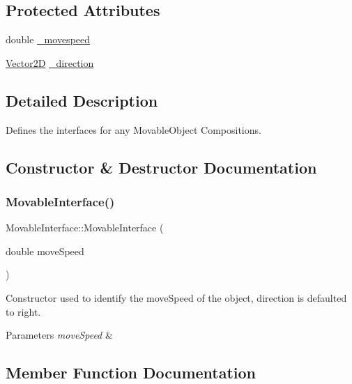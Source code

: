 \subsection*{Protected Attributes}
\begin{DoxyCompactItemize}
\item 
double \hyperlink{class_movable_interface_aa9715fd066607de7e71ee7f891ae1dbd}{\+\_\+movespeed}
\item 
\hyperlink{class_vector2_d}{Vector2D} \hyperlink{class_movable_interface_aea3e1edf8c32ebe5fd37dc02d659c10d}{\+\_\+direction}
\end{DoxyCompactItemize}


\subsection{Detailed Description}
Defines the interfaces for any Movable\+Object Compositions. 

\subsection{Constructor \& Destructor Documentation}
\mbox{\label{class_movable_interface_a480a181d92f826515483b8ba57e4f030}} 
\subsubsection{\texorpdfstring{Movable\+Interface()}{MovableInterface()}}
{\footnotesize\ttfamily Movable\+Interface\+::\+Movable\+Interface (\begin{DoxyParamCaption}\item[{double}]{move\+Speed }\end{DoxyParamCaption})\hspace{0.3cm}{\ttfamily [inline]}}



Constructor used to identify the move\+Speed of the object, direction is defaulted to right. 


\begin{DoxyParams}{Parameters}
{\em move\+Speed} & \\
\hline
\end{DoxyParams}


\subsection{Member Function Documentation}
\mbox{\label{class_movable_interface_a899cc1c78eacbee13b906c6770e7f025}} 
